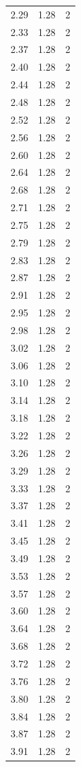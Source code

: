 \begin{longtable}{lrr}
  2.29 & 1.28 & 2 \\
  2.33 & 1.28 & 2 \\
  2.37 & 1.28 & 2 \\
  2.40 & 1.28 & 2 \\
  2.44 & 1.28 & 2 \\
  2.48 & 1.28 & 2 \\
  2.52 & 1.28 & 2 \\
  2.56 & 1.28 & 2 \\
  2.60 & 1.28 & 2 \\
  2.64 & 1.28 & 2 \\
  2.68 & 1.28 & 2 \\
  2.71 & 1.28 & 2 \\
  2.75 & 1.28 & 2 \\
  2.79 & 1.28 & 2 \\
  2.83 & 1.28 & 2 \\
  2.87 & 1.28 & 2 \\
  2.91 & 1.28 & 2 \\
  2.95 & 1.28 & 2 \\
  2.98 & 1.28 & 2 \\
  3.02 & 1.28 & 2 \\
  3.06 & 1.28 & 2 \\
  3.10 & 1.28 & 2 \\
  3.14 & 1.28 & 2 \\
  3.18 & 1.28 & 2 \\
  3.22 & 1.28 & 2 \\
  3.26 & 1.28 & 2 \\
  3.29 & 1.28 & 2 \\
  3.33 & 1.28 & 2 \\
  3.37 & 1.28 & 2 \\
  3.41 & 1.28 & 2 \\
  3.45 & 1.28 & 2 \\
  3.49 & 1.28 & 2 \\
  3.53 & 1.28 & 2 \\
  3.57 & 1.28 & 2 \\
  3.60 & 1.28 & 2 \\
  3.64 & 1.28 & 2 \\
  3.68 & 1.28 & 2 \\
  3.72 & 1.28 & 2 \\
  3.76 & 1.28 & 2 \\
  3.80 & 1.28 & 2 \\
  3.84 & 1.28 & 2 \\
  3.87 & 1.28 & 2 \\
  3.91 & 1.28 & 2 \\

\end{longtable}
